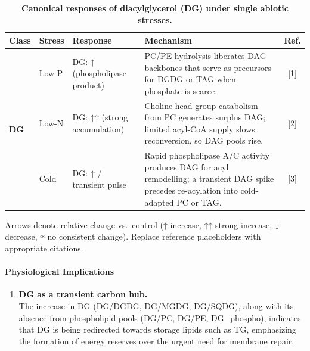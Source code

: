 \documentclass[10pt,letterpaper]{article}
\begin{document}
\begin{table}[!ht]
  \centering
  \caption{\bf Canonical responses of diacylglycerol (DG) under single abiotic stresses.}
  \label{table:DG_responses}
  \begin{tabularx}{\textwidth}{@{} l l p{3.5cm} X c @{}}
    \toprule
    \textbf{Class}
      & \textbf{Stress}
      & \textbf{Response}
      & \textbf{Mechanism}
      & \textbf{Ref.} \\
    \midrule
    \multirow{3}{*}{\textbf{DG}}
      & Low-P  
         & \begin{minipage}[t]{3.5cm}
             DG: ↑ (phospholipase product)
           \end{minipage}
         & PC/PE hydrolysis liberates DAG backbones that serve as precursors for DGDG or TAG when phosphate is scarce.
         & [1] \\[1ex]
      & Low-N  
         & \begin{minipage}[t]{3.5cm}
             DG: ↑↑ (strong accumulation)
           \end{minipage}
         & Choline head-group catabolism from PC generates surplus DAG; limited acyl-CoA supply slows reconversion, so DAG pools rise.
         & [2] \\[1ex]
      & Cold   
         & \begin{minipage}[t]{3.5cm}
             DG: ↑ / transient pulse
           \end{minipage}
         & Rapid phospholipase A/C activity produces DAG for acyl remodelling; a transient DAG spike precedes re-acylation into cold-adapted PC or TAG.
         & [3] \\
    \bottomrule
  \end{tabularx}
  \begin{flushleft}
    {\footnotesize Arrows denote relative change vs.\ control (↑ increase, ↑↑ strong increase, ↓ decrease, ≈ no consistent change).  Replace reference placeholders with appropriate citations.}
  \end{flushleft}
\end{table}


\paragraph{Physiological Implications}
\begin{enumerate}
  \item \textbf{DG as a transient carbon hub.}  \\
        The increase in DG (DG/DGDG, DG/MGDG, DG/SQDG), along with its absence from phospholipid pools (DG/PC, DG/PE, DG\_phospho), indicates that DG is being redirected towards storage lipids such as TG, emphasizing the formation of energy reserves over the urgent need for membrane repair.
\end{enumerate}
\end{document}
